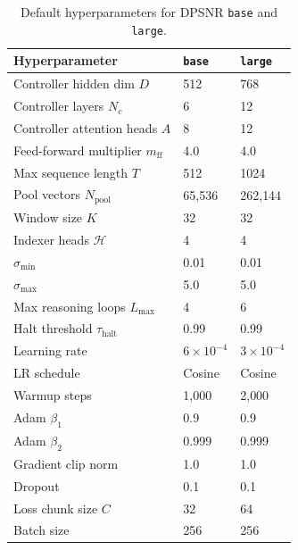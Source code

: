 \documentclass[11pt]{article}
\begin{document}
\begin{table}[H]
\centering
\caption{Default hyperparameters for DPSNR \texttt{base} and \texttt{large}.}
\label{tab:hparams}
\setlength{\tabcolsep}{4pt}
\begin{tabular}{lll}
\toprule
Hyperparameter & \texttt{base} & \texttt{large} \\
\midrule
Controller hidden dim $D$ & 512 & 768 \\
Controller layers $N_c$ & 6 & 12 \\
Controller attention heads $A$ & 8 & 12 \\
Feed-forward multiplier $m_{\text{ff}}$ & 4.0 & 4.0 \\
Max sequence length $T$ & 512 & 1024 \\
Pool vectors $N_{\text{pool}}$ & 65{,}536 & 262{,}144 \\
Window size $K$ & 32 & 32 \\
Indexer heads $\mathcal{H}$ & 4 & 4 \\
$\sigma_{\min}$ & 0.01 & 0.01 \\
$\sigma_{\max}$ & 5.0 & 5.0 \\
Max reasoning loops $L_{\max}$ & 4 & 6 \\
Halt threshold $\tau_{\mathrm{halt}}$ & 0.99 & 0.99 \\
Learning rate & $6 \times 10^{-4}$ & $3 \times 10^{-4}$ \\
LR schedule & Cosine & Cosine \\
Warmup steps & 1{,}000 & 2{,}000 \\
Adam $\beta_1$ & 0.9 & 0.9 \\
Adam $\beta_2$ & 0.999 & 0.999 \\
Gradient clip norm & 1.0 & 1.0 \\
Dropout & 0.1 & 0.1 \\
Loss chunk size $C$ & 32 & 64 \\
Batch size & 256 & 256 \\
\bottomrule
\end{tabular}
\end{table}
\end{document}
